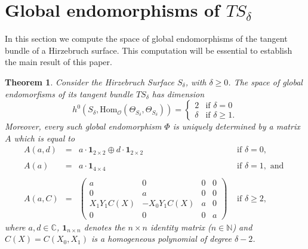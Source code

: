 \documentclass{amsart} %
\newtheorem{theorem}{Theorem}[section]
\theoremstyle{definition}
\newcommand{\ctM}{\Theta_{M}}
\newcommand{\cts}{\Theta_{S_{\delta}}}
\newcommand{\cs}{S_{\delta}}
\newcommand{\mcL}{\mathcal{L}}
\newcommand{\mcO}{\mathcal{O}}
\begin{document}
\section{Global endomorphisms of $T\cs$}  \label{La4}
In this section we compute the space of global endomorphisms of the tangent bundle of a Hirzebruch surface. This computation will be essential to establish the main result of this paper.
\begin{theorem}\label{endtang}
 Consider the Hirzebruch Surface  $ S_{\delta} $, with $ \delta \geq 0 $.
 The space of global endomorfisms of its tangent bundle $T\cs$ has dimension
 $$
 h^0(S_{\delta},\mathrm{Hom}_{ \mcO} (\cts, \cts))=
    \begin{cases}
              2 & \mbox{if } \delta = 0\\
       \delta & \mbox{if } \delta \geq 1.
    \end{cases}
 $$
 Moreover, every such global endomorphism $\Phi$ is uniquely determined by a matrix $ A $ which is equal to
 \begin{equation*}
 \begin{array}{cccl}
   A(a, d) &= & a \cdot \mathbf{1}_{2\times 2} \oplus d \cdot \mathbf{1}_{2\times 2} &\text{ if } \delta = 0,  \\ \\
   A(a) &= & a \cdot \mathbf{1}_{4\times 4} &\text{ if } \delta = 1, \text{ and }\\ \\
   A(a,C) &= & \left( \begin{matrix} %
       a & 0 & 0 & 0 \\
       0 & a & 0 & 0 \\
       X_{1}Y_{1}C(X) & -X_{0}Y_{1}C(X)  & a & 0 \\
       0 & 0 & 0 & a
    \end{matrix} \right) &\text{ if } \delta \geq 2 ,
 \end{array}
\end{equation*}
 where $ a, d \in \mathbb{C} $, $ \mathbf{1}_{n\times n} $
 denotes the $ n\times n $ identity matrix ($n \in \mathbb{N}$) and $ C(X) = C(X_{0}, X_{1}) $ is a homogeneous polynomial of degree $ \delta - 2 $.


\end{theorem}
\end{document}
